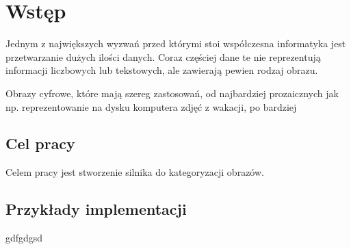 \chapter*{Wstęp}

Jednym z największych wyzwań przed którymi stoi współczesna informatyka jest przetwarzanie dużych ilości danych. Coraz częściej dane te nie reprezentują informacji liczbowych lub tekstowych, ale zawierają pewien rodzaj obrazu. 

Obrazy cyfrowe, które mają szereg zastosowań, od najbardziej prozaicznych jak np. reprezentowanie na dysku komputera zdjęć z wakacji, po bardziej 

\section*{Cel pracy}
Celem pracy jest stworzenie silnika do kategoryzacji obrazów.

\section*{Przykłady implementacji}
gdfgdgsd